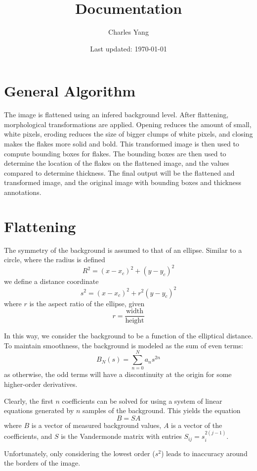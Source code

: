 \documentclass{article}
\title{Documentation}
\author{Charles Yang}
\date{Last updated: \today}
\begin{document}
\maketitle
\setcounter{tocdepth}{1}
\tableofcontents
\break{}
\section{General Algorithm}
The image is flattened using an infered background level. After flattening, morphological transformations are applied. Opening reduces the amount of small, white pixels, eroding reduces the size of bigger clumps of white pixels, and closing makes the flakes more solid and bold. This transformed image is then used to compute bounding boxes for flakes. The bounding boxes are then used to determine the location of the flakes on the flattened image, and the values compared to determine thickness. The final output will be the flattened and transformed image, and the original image with bounding boxes and thickness annotations.

\section{Flattening}
The symmetry of the background is assumed to that of an ellipse. Similar to a circle, where the radius is defined
\[R^2=(x-x_c)^2+(y-y_c)^2\]
we define a distance coordinate
\[s^2=(x-x_c)^2+r^2(y-y_c)^2\]
where \(r\) is the aspect ratio of the ellipse, given
\[r = \frac{\text{width}}{\text{height}}\]

In this way, we consider the background to be a function of the elliptical distance. To maintain smoothness, the background is modeled as the sum of even terms:
\begin{equation}
B_N(s)=\sum_{n=0}^N a_ns^{2n}
\end{equation}
as otherwise, the odd terms will have a discontinuity at the origin for some higher-order derivatives.

Clearly, the first \(n\) coefficients can be solved for using a system of linear equations generated by \(n\) samples of the background. This yields the equation
\[B = SA\]
where \(B\) is a vector of measured background values, \(A\) is a vector of the coefficients, and \(S\) is the Vandermonde matrix with entries \(S_{ij}=s_i^{2(j-1)}\). 



Unfortunately, only considering the lowest order (\(s^2\)) leads to inaccuracy around the borders of the image. 
\end{document}
